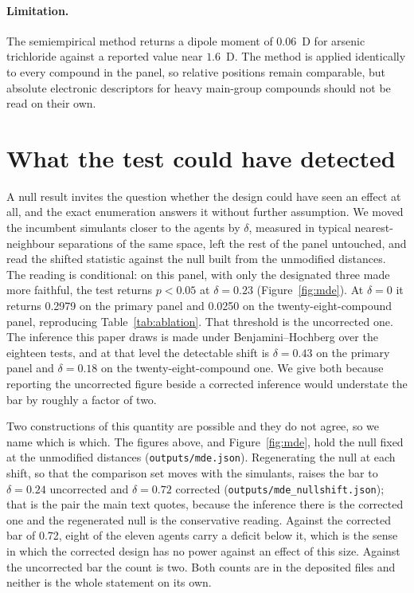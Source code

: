 \documentclass[11pt,a4paper]{article}
\begin{document}
\paragraph*{Limitation.}
The semiempirical method returns a dipole moment of $0.06$~D for arsenic
trichloride against a reported value near $1.6$~D. The method is applied
identically to every compound in the panel, so relative positions remain
comparable, but absolute electronic descriptors for heavy main-group compounds
should not be read on their own.

\section{What the test could have detected}
\label{res:mde}

A null result invites the question whether the design could have seen an effect
at all, and the exact enumeration answers it without further assumption. We
moved the incumbent simulants closer to the agents by $\delta$, measured in
typical nearest-neighbour separations of the same space, left the rest of the
panel untouched, and read the shifted statistic against the null built from the
unmodified distances. The reading is conditional: on this panel, with only the
designated three made more faithful, the test returns $p<0.05$ at
$\delta = 0.23$ (Figure~\ref{fig:mde}). At $\delta = 0$ it returns 0.2979 on
the primary panel and 0.0250 on the twenty-eight-compound panel, reproducing
Table~\ref{tab:ablation}. That threshold is the uncorrected one. The inference
this paper draws is made under Benjamini--Hochberg over the eighteen tests, and
at that level the detectable shift is $\delta = 0.43$ on the primary panel and
$\delta = 0.18$ on the twenty-eight-compound one. We give both because
reporting the uncorrected figure beside a corrected inference would understate
the bar by roughly a factor of two.

Two constructions of this quantity are possible and they do not agree, so we
name which is which. The figures above, and Figure~\ref{fig:mde}, hold the null
fixed at the unmodified distances
(\texttt{outputs/mde.json}). Regenerating the null at each shift, so that the
comparison set moves with the simulants, raises the bar to $\delta = 0.24$
uncorrected and $\delta = 0.72$ corrected
(\texttt{outputs/mde\_nullshift.json}); that is the pair the main text quotes,
because the inference there is the corrected one and the regenerated null is
the conservative reading. Against the corrected bar of 0.72, eight of the
eleven agents carry a deficit below it, which is the sense in which the
corrected design has no power against an effect of this size. Against the
uncorrected bar the count is two. Both counts are in the deposited files and
neither is the whole statement on its own.
\end{document}
